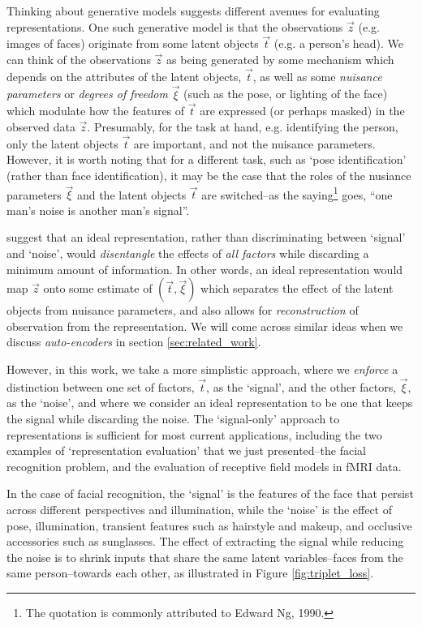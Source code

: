 
Thinking about generative models suggests different avenues for
evaluating representations.  One such generative model is that the
observations $\vec{z}$ (e.g. images of faces) originate from some
latent objects $\vec{t}$ (e.g. a person's head).  We can think of the
observations $\vec{z}$ as being generated by some mechanism which
depends on the attributes of the latent objects, $\vec{t}$, as well as
some \emph{nuisance parameters} or \emph{degrees of freedom}
$\vec{\xi}$ (such as the pose, or lighting of the face) which modulate
how the features of $\vec{t}$ are expressed (or perhaps masked) in the
observed data $\vec{z}$.  Presumably, for the task at hand,
e.g. identifying the person, only the latent objects $\vec{t}$ are
important, and not the nuisance parameters.  However, it is worth
noting that for a different task, such as `pose identification'
(rather than face identification), it may be the case that the roles
of the nusiance parameters $\vec{\xi}$ and the latent objects
$\vec{t}$ are switched--as the saying\footnote{The quotation is
  commonly attributed to Edward Ng, 1990.} goes, ``one man's noise
is another man's signal''.

\cite{bengio2013representation} suggest that an ideal representation,
rather than discriminating between `signal' and `noise', would
\emph{disentangle} the effects of \emph{all factors} while discarding
a minimum amount of information.  In other words, an ideal
representation would map $\vec{z}$ onto some estimate of $(\vec{t},
\vec{\xi})$ which separates the effect of the latent objects from
nuisance parameters, and also allows for \emph{reconstruction} of
observation from the representation.  We will come across similar
ideas when we discuss \emph{auto-encoders} in section
\ref{sec:related_work}.

However, in this work, we take a more simplistic approach, where we
\emph{enforce} a distinction between one set of factors, $\vec{t}$, as
the `signal', and the other factors, $\vec{\xi}$, as the `noise', and
where we consider an ideal representation to be one that keeps the
signal while discarding the noise. The `signal-only' approach to
representations is sufficient for most current applications, including
the two examples of `representation evaluation' that we just
presented--the facial recognition problem, and the evaluation of
receptive field models in fMRI data.

In the case of facial recognition, the `signal' is the features of the
face that persist across different perspectives and illumination,
while the `noise' is the effect of pose, illumination, transient
features such as hairstyle and makeup, and occlusive accessories such
as sunglasses.  
The effect of extracting the signal while reducing the
noise is to shrink inputs that share the same latent variables--faces
from the same person--towards each other, as illustrated in Figure
\ref{fig:triplet_loss}.

